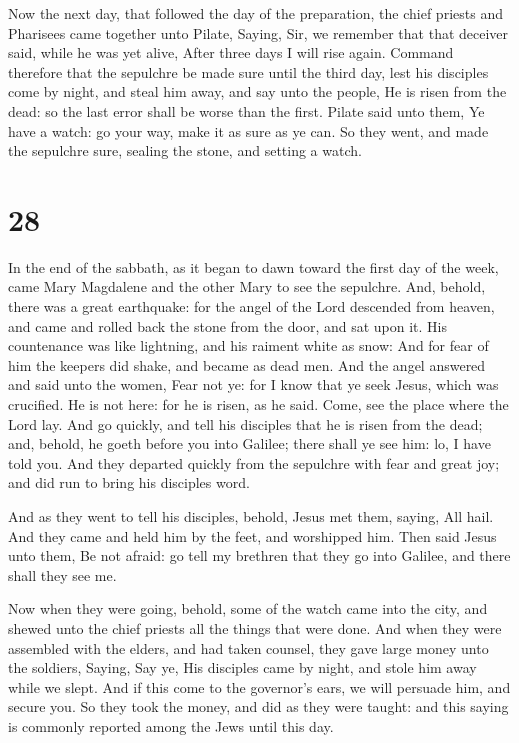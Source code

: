  Now the next day, that followed the day of the
preparation, the chief priests and Pharisees came together unto Pilate,
 Saying, Sir, we remember that that deceiver said, while he
was yet alive, After three days I will rise again.  Command
therefore that the sepulchre be made sure until the third day, lest his
disciples come by night, and steal him away, and say unto the people, He
is risen from the dead: so the last error shall be worse than the first.
 Pilate said unto them, Ye have a watch: go your way, make
it as sure as ye can.  So they went, and made the sepulchre
sure, sealing the stone, and setting a watch.

\hypertarget{section-27}{%
\section{28}\label{section-27}}

 In the end of the sabbath, as it began to dawn toward the
first day of the week, came Mary Magdalene and the other Mary to see the
sepulchre.  And, behold, there was a great earthquake: for
the angel of the Lord descended from heaven, and came and rolled back
the stone from the door, and sat upon it.  His countenance
was like lightning, and his raiment white as snow:  And for
fear of him the keepers did shake, and became as dead men. 
And the angel answered and said unto the women, Fear not ye: for I know
that ye seek Jesus, which was crucified.  He is not here:
for he is risen, as he said. Come, see the place where the Lord lay.
 And go quickly, and tell his disciples that he is risen
from the dead; and, behold, he goeth before you into Galilee; there
shall ye see him: lo, I have told you.  And they departed
quickly from the sepulchre with fear and great joy; and did run to bring
his disciples word.

 And as they went to tell his disciples, behold, Jesus met
them, saying, All hail. And they came and held him by the feet, and
worshipped him.  Then said Jesus unto them, Be not afraid:
go tell my brethren that they go into Galilee, and there shall they see
me.

 Now when they were going, behold, some of the watch came
into the city, and shewed unto the chief priests all the things that
were done.  And when they were assembled with the elders,
and had taken counsel, they gave large money unto the soldiers,
 Saying, Say ye, His disciples came by night, and stole him
away while we slept.  And if this come to the governor's
ears, we will persuade him, and secure you.  So they took
the money, and did as they were taught: and this saying is commonly
reported among the Jews until this day.

